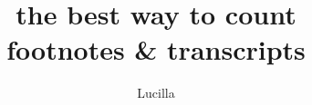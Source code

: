 \documentclass[a4paper, 11pt]{report}
\title{\Huge the best way to count \medskip \\ \huge footnotes \& transcripts}
\author{\Large Lucilla}
\date{}
\begin{document}
\vfill \maketitle \vfill \newpage











\newpage


\end{document}
